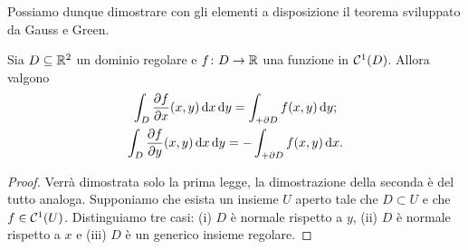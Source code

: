 Possiamo dunque dimostrare con gli elementi a disposizione il teorema sviluppato da Gauss e Green.
\begin{teorema} \label{t:gauss-green}
	Sia $D\subseteq\mathbb{R}^2$ un dominio regolare e $f\colon D\to\mathbb{R}$ una funzione in $\mathcal{C}^{{1}}(D)$.
	Allora valgono
	\begin{gather}
		\int_D\frac{\partial {f}}{\partial {x}}(x,y)\,\textup{d} x\,\textup{d} y=\int_{+\partial D}f(x,y)\,\textup{d} y;
		\label{eq:gauss-green-y}\\
		\int_D\frac{\partial {f}}{\partial {y}}(x,y)\,\textup{d} x\,\textup{d} y=-\int_{+\partial D}f(x,y)\,\textup{d} x.
		\label{eq:gauss-green-x}
	\end{gather}
\end{teorema}
\begin{proof}
	Verrà dimostrata solo la prima legge, la dimostrazione della seconda è del tutto analoga.
	Supponiamo che esista un insieme $U$ aperto tale che $D\subset U$ e che $f\in\mathcal{C}^{{1}}(U)$.
	Distinguiamo tre casi: (i) $D$ è normale rispetto a $y$, (ii) $D$ è normale rispetto a $x$ e (iii) $D$ è un generico insieme regolare.


\end{proof}
